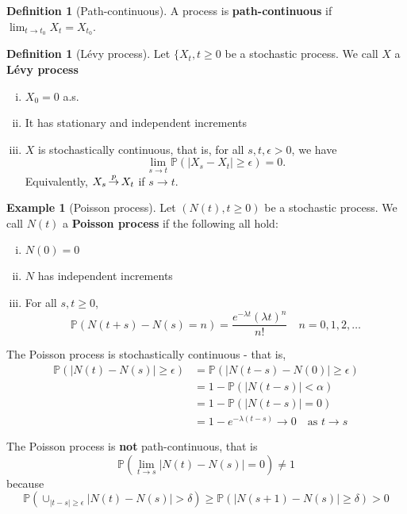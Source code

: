 \documentclass[10pt, oneside, reqno]{amsart}
\theoremstyle{plain}%
\theoremstyle{definition}
\newtheorem{defn}[thm]{Definition}
\newtheorem{exmp}[thm]{Example}
\theoremstyle{remark}
\renewcommand{\P}{\mathbb{P}}
\def\cip{\,{\buildrel p \over \rightarrow}\,}
\begin{document}
\begin{defn}[Path-continuous]
	A process is \textbf{path-continuous} if $\lim_{t \rightarrow t_0} X_t = X_{t_0}$.
\end{defn}

\begin{defn}[L\'evy process]
	Let $\{X_t, t \geq 0$ be a stochastic process.  We call $X$ a \textbf{L\'evy process}
	\begin{enumerate}[(i)]
		\item $X_0 = 0$ a.s.
		\item It has stationary and independent increments
		\item $X$ is stochastically continuous, that is, for all $s, t, \epsilon > 0$, we have \[
			\lim_{s \rightarrow t} \P(|X_s - X_t| \geq \epsilon) = 0.
		\]  Equivalently, $X_s \cip X_t$ if $s \rightarrow t$.
	\end{enumerate}
\end{defn}

\begin{exmp}[Poisson process]
	Let $(N(t), t \geq 0 )$ be a stochastic process.  We call $N(t)$ a \textbf{Poisson process} if the following all hold: 
	\begin{enumerate}[(i)]
		\item $N(0) = 0$
		\item $N$ has independent increments
		\item For all $s, t \geq 0$, \[
			\P(N(t+s)-N(s) = n) = \frac{e^{-\lambda t}(\lambda t)^n}{n!} \quad n = 0, 1, 2, \dots
		\]
	\end{enumerate}

	The Poisson process is stochastically continuous - that is,
	\begin{align*}
		\P( | N(t) - N(s) | \geq \epsilon) 	&= \P(|N(t - s) - N(0) | \geq \epsilon) \\
		 									&= 1- \P(|N(t-s) | < \alpha ) \\
											&= 1 - \P(|N(t - s) | = 0 ) \\
											&= 1 - e^{-\lambda(t-s)} \rightarrow 0 \quad \text{as $t \rightarrow s$}
	\end{align*}
	
	The Poisson process is \textbf{not} path-continuous, that is \[
		\P( \lim_{t \rightarrow s} |N(t) - N(s)| = 0) \neq 1
	\] because \[
		\P( \displaystyle\cup_{|t-s| \geq \epsilon} |N(t) - N(s)| > \delta ) \geq \P(|N(s+1) - N(s) | \geq \delta ) > 0
	\]
\end{exmp}
\end{document}
